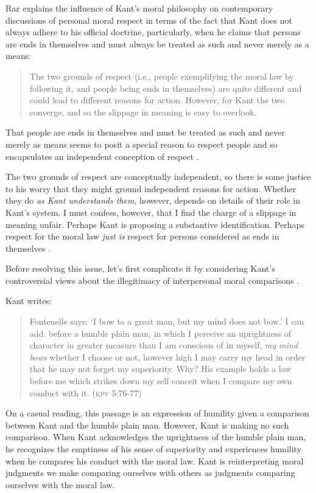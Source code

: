 \documentclass[12pt]{article}
\begin{document}
Raz explains the influence of Kant's moral philosophy on contemporary discussions of personal moral respect in terms of the fact that Kant does not always adhere to his official doctrine, particularly, when he claims that persons are ends in themselves and must always be treated as such and never merely as a means: 
\begin{quote}
	The two grounds of respect (i.e., people exemplifying the moral law by following it, and people being ends in themselves) are quite different and could lead to different reasons for action. However, for Kant the two converge, and so the slippage in meaning is easy to overlook. \citep[136]{Raz:2001ps} 
\end{quote}
That people are ends in themselves and must be treated as such and never merely as means seems to posit a special reason to respect people and so encapsulates an independent conception of respect \citep[for discussion relevant to the distinction Raz is drawing see][]{Darwall:1977ty,Frankena:1986sf}.

The two grounds of respect are conceptually independent, so there is some justice to his worry that they might ground independent reasons for action. Whether they do \emph{as Kant understands them}, however, depends on details of their role in Kant's system. I must confess, however, that I find the charge of a slippage in meaning unfair. Perhaps Kant is proposing a substantive identification. Perhaps respect for the moral law \emph{just is} respect for persons considered as ends in themselves \citep[see][for a similar suggestion]{Velleman:2006nx}. 

Before resolving this issue, let's first complicate it by considering Kant's controversial views about the illegitimacy of interpersonal moral comparisons \citep[see][ch.~4, \S6]{Wood:1999zy}.

Kant writes: 
\begin{quote}
	Fontenelle says: `I bow to a great man, but my mind does not bow.' I can add: before a humble plain man, in which I perceive an uprightness of character in greater measure than I am conscious of in myself, \emph{my mind bows} whether I choose or not, however high I may carry my head in order that he may not forget my superiority. Why? His example holds a law before me which strikes down my self conceit when I compare my own conduct with it. (\textsc{kpv} 5:76-77) 
\end{quote}

On a casual reading, this passage is an expression of humility given a comparison between Kant and the humble plain man. However, Kant is making no such comparison. When Kant acknowledges the uprightness of the humble plain man, he recognizes the emptiness of his sense of superiority and experiences humility when he compares his conduct with the moral law. Kant is reinterpreting moral judgments we make comparing ourselves with others as judgments comparing ourselves with the moral law.
\end{document}
